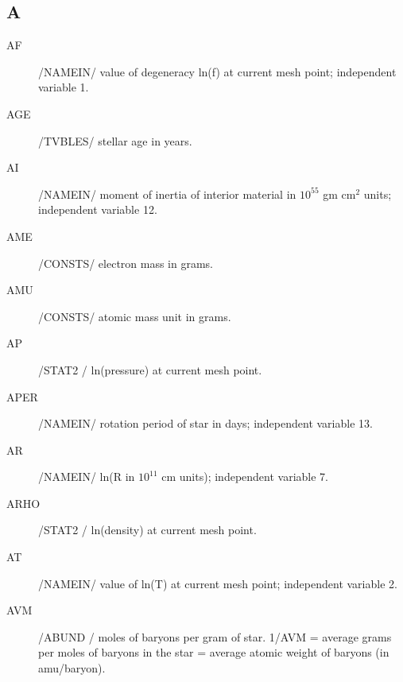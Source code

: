 \documentclass{article}
\begin{document}
\subsection*{A}
\begin{description}

	\item[AF]  /NAMEIN/ value of degeneracy ln(f) at current mesh point; independent variable 1.
	
	\item[AGE]  /TVBLES/ stellar age in years.
	
	\item[AI] /NAMEIN/ moment of inertia of interior material in $10^{55}$ gm cm$^2$ units; independent variable 12.
	
	\item[AME]  /CONSTS/ electron mass in grams.
	
	\item[AMU] /CONSTS/ atomic mass unit in grams.
	
	\item[AP]  /STAT2 / ln(pressure) at current mesh point.
	
	\item[APER] /NAMEIN/ rotation period of star in days; independent variable 13.
	
	\item[AR]		    /NAMEIN/ ln(R in $10^{11}$ cm units); independent variable 7.
	
	\item[ARHO]		/STAT2 / ln(density) at current mesh point.
	
	\item[AT]		    /NAMEIN/ value of ln(T) at current mesh point; independent variable 2.
	
   	\item[AVM]     	/ABUND / moles of baryons per gram of star.
				         1/AVM = average grams per moles of baryons in the star
				               = average atomic weight of baryons (in amu/baryon).
\end{description}
\end{document}

